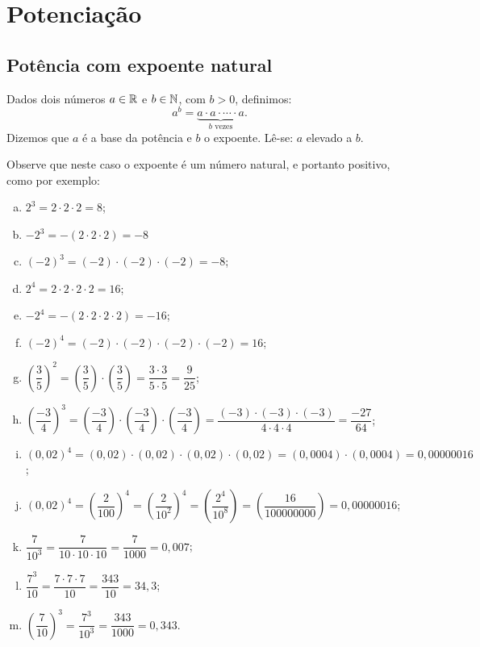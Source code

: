 \construirExer

\chapter{Potenciação}

 \section{Potência com expoente natural}

 \vskip0.3cm

 \colorbox{azul}{
 \begin{minipage}{0.9\linewidth}
 \begin{center}
  Dados dois números $a \in \mathbb{R}$ e $b \in \mathbb{N}$, com $b > 0$, definimos:
\begin{equation}
a^b= \underbrace{a \cdot a \cdot \cdots \cdot a}_{b \text{ vezes}} .
\end{equation}
  Dizemos que $a$ é a base da potência e $b$ o expoente. Lê-se: $a$ elevado a $b$.
 \end{center}
 \end{minipage}}

 \vskip0.3cm

 \begin{exem}
 Observe que neste caso o expoente é um número natural, e portanto positivo, como por exemplo:

 \begin{enumerate}[a)]
  \item $2^3= 2 \cdot 2 \cdot 2= 8$;
  \item $-2^3= -(2 \cdot 2 \cdot 2)= -8$
  \item $(-2)^3= (-2) \cdot (-2) \cdot (-2)= -8$;
  \item $2^4=2 \cdot 2 \cdot 2 \cdot  2= 16$;
  \item $-2^4= -(2 \cdot 2 \cdot 2 \cdot 2)= -16$;
  \item $(-2)^4= (-2) \cdot (-2) \cdot (-2) \cdot (-2)= 16$;
  \item $\left(\dfrac{3}{5}\right)^2= \left(\dfrac{3}{5}\right) \cdot \left(\dfrac{3}{5}\right)= \dfrac{3 \cdot 3}{5 \cdot 5}= \dfrac{9}{25}$;
  \item $\left(\dfrac{-3}{4}\right)^3= \left(\dfrac{-3}{4}\right) \cdot \left(\dfrac{-3}{4}\right) \cdot \left(\dfrac{-3}{4}\right)= \dfrac{(-3) \cdot (-3) \cdot (-3)}{4 \cdot 4 \cdot 4}= \dfrac{-27}{64}$;
  \item $(0,02)^4= (0,02) \cdot (0,02) \cdot (0,02) \cdot (0,02)= (0,0004) \cdot (0,0004)= 0,00000016$;
  \item $(0,02)^4= \left(\dfrac{2}{100}\right)^4= \left(\dfrac{2}{10^2}\right)^4= \left(\dfrac{2^4}{10^8}\right)= \left(\dfrac{16}{100000000}\right)= 0,00000016$;
  \item $\dfrac{7}{10^3}= \dfrac{7}{10 \cdot 10 \cdot 10}= \dfrac{7}{1000}= 0,007$;
  \item $\dfrac{7^3}{10}=  \dfrac{7 \cdot 7 \cdot 7}{10}= \dfrac{343}{10}=34,3$;
  \item $\left(\dfrac{7}{10}\right)^3= \dfrac{7^3}{10^3}= \dfrac{343}{1000}= 0,343$.
  \end{enumerate}

 \end{exem}

